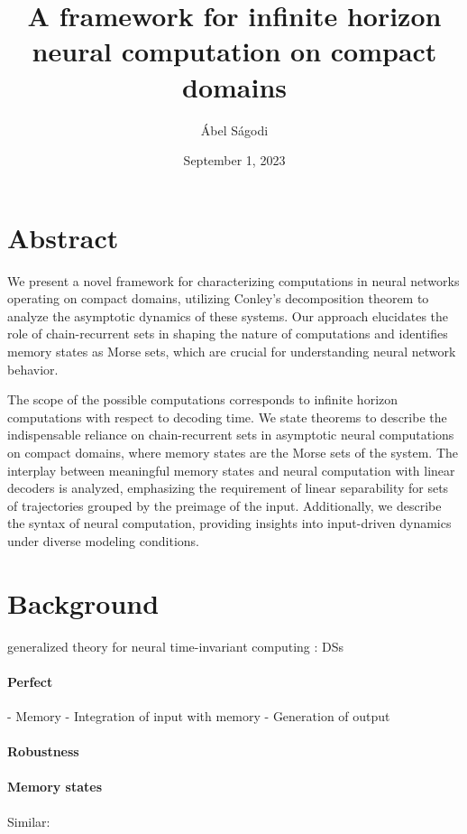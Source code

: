 \documentclass{scrartcl}
\title{A framework for infinite horizon neural computation on compact domains}
\author{\'Abel S\'agodi}
\date{September 1, 2023}
\theoremstyle{definition}
\theoremstyle{remark}
\begin{document}
\maketitle


\section*{Abstract}
We present a novel framework for characterizing computations in neural networks operating on compact domains, utilizing Conley’s decomposition theorem to analyze the asymptotic dynamics of these systems. Our approach elucidates the role of chain-recurrent sets in shaping the nature of computations and identifies memory states as Morse sets, which are crucial for understanding neural network behavior.

The scope of the possible computations corresponds to infinite horizon computations with respect to decoding time.
We state theorems to describe the indispensable reliance on chain-recurrent sets in asymptotic neural computations on compact domains, where memory states are the Morse sets of the system.
The interplay between meaningful memory states and neural computation with linear decoders is analyzed, emphasizing the requirement of linear separability for sets of trajectories grouped by the preimage of the input. 
Additionally, we describe the syntax of neural computation, providing insights into input-driven dynamics under diverse modeling conditions. 




\section*{Background}%

generalized theory for neural time-invariant computing \citep{jaeger2021,jaeger2023theory}:
DSs



\paragraph{Perfect}
- Memory 
- Integration of input with memory
- Generation of output


\paragraph{Robustness}
\citep{Park2023a}



\paragraph{Memory states}
Similar: \citep{casey1996}
\end{document}
